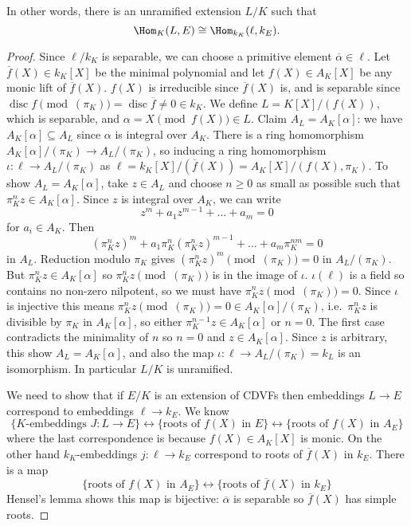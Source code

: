 \documentclass[a4paper]{article}
\begin{document}
In other words, there is an unramified extension \(L/K\) such that
\[
  \Hom_K(L, E) \cong \Hom_{k_K}(\ell, k_E).
\]

\begin{proof}
  Since \(\ell/k_K\) is separable, we can choose a primitive element \(\overline \alpha \in \ell\). Let \(\overline f(X) \in k_K[X]\) be the minimal polynomial and let \(f(X) \in A_K[X]\) be any monic lift of \(\overline f(X)\). \(f(X)\) is irreducible since \(\overline f(X)\) is, and is separable since \(\operatorname{disc} f \pmod{(\pi_K)} = \operatorname{disc} \overline f \neq 0 \in k_K\). We define \(L = K[X]/(f(X))\), which is separable, and \(\alpha = X \pmod{f(X)} \in L\). Claim \(A_L = A_K[\alpha]\): we have \(A_K[\alpha] \subseteq A_L\) since \(\alpha\) is integral over \(A_K\). There is a ring homomorphism \(A_K[\alpha]/(\pi_K) \to A_L/(\pi_K)\), so inducing a ring homomorphism \(\iota: \ell \to A_L/(\pi_K)\) as \(\ell = k_K[X]/(\overline f(X)) = A_K[X]/(f(X), \pi_K)\). To show \(A_L = A_K[\alpha]\), take \(z \in A_L\) and choose \(n \geq 0\) as small as possible such that \(\pi_K^nz \in A_K[\alpha]\). Since \(z\) is integral over \(A_K\), we can write
  \[
    z^m + a_1z^{m - 1} + \dots + a_m = 0
  \]
  for \(a_i \in A_K\). Then
  \[
    (\pi_K^n z)^m + a_1\pi_K^n (\pi_K^nz)^{m - 1} + \dots + a_m \pi_K^{nm} = 0
  \]
  in \(A_L\). Reduction modulo \(\pi_K\) gives \((\pi_K^n z)^m \pmod{(\pi_K)} = 0\) in \(A_L/(\pi_K)\). But \(\pi^n_K z \in A_K[\alpha]\) so \(\pi^n_K z \pmod{(\pi_K)}\) is in the image of \(\iota\). \(\iota(\ell)\) is a field so contains no non-zero nilpotent, so we must have \(\pi_K^n z \pmod{(\pi_K)} = 0\). Since \(\iota\) is injective this means \(\pi_K^n z \pmod{(\pi_K)} = 0 \in A_K[\alpha]/(\pi_K)\), i.e.\ \(\pi_K^n z\) is divisible by \(\pi_K\) in \(A_K[\alpha]\), so either \(\pi_K^{n - 1}z \in A_K[\alpha]\) or \(n = 0\). The first case contradicts the minimality of \(n\) so \(n = 0\) and \(z \in A_K[\alpha]\). Since \(z\) is arbitrary, this show \(A_L = A_K[\alpha]\), and also the map \(\iota: \ell \to A_L/(\pi_K) = k_L\) is an isomorphism. In particular \(L/K\) is unramified.

  We need to show that if \(E/K\) is an extension of CDVFs then embeddings \(L \to E\) correspond to embeddings \(\ell \to k_E\). We know
  \[
    \{K\text{-embeddings } J: L \to E\}
    \longleftrightarrow
    \{\text{roots of } f(X) \text{ in } E\}
    \longleftrightarrow
    \{\text{roots of } f(X) \text{ in } A_E\}
  \]
  where the last correspondence is because \(f(X) \in A_K[X]\) is monic. On the other hand \(k_K\)-embeddings \(j: \ell \to k_E\) correspond to roots of \(\overline f(X)\) in \(k_E\). There is a map
  \[
    \{\text{roots of } f(X) \text{ in } A_E\}
    \longleftrightarrow
    \{\text{roots of } \overline f(X) \text{ in } k_E\}
  \]
  Hensel's lemma shows this map is bijective: \(\overline \alpha\) is separable so \(\overline f(X)\) has simple roots.
\end{proof}
\end{document}
